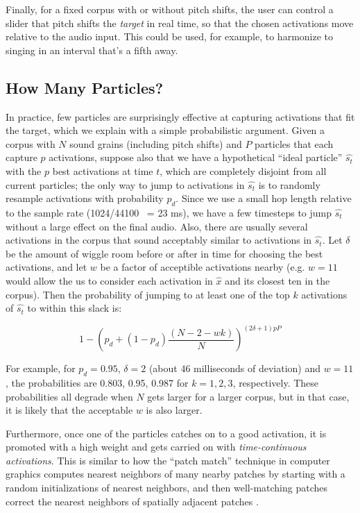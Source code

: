 \documentclass{article}
\begin{document}
Finally, for a fixed corpus with or without pitch shifts, the user can control a slider that pitch shifts the {\em target} in real time, so that the chosen activations move relative to the audio input.  This could be used, for example, to harmonize to singing in an interval that's a fifth away.

\subsection{How Many Particles?}
\label{sec:howmanyparticles}
In practice, few particles are surprisingly effective at capturing activations that fit the target, which we explain with a simple probabilistic argument.  Given a corpus with $N$ sound grains (including pitch shifts) and $P$ particles that each capture $p$ activations, suppose also that we have a hypothetical ``ideal particle'' $\hat{s_t}$ with the $p$ best activations at time $t$, which are completely disjoint from all current particles; the only way to jump to activations in $\hat{s_t}$ is to randomly resample activations with probability $p_d$.  Since we use a small hop length relative to the sample rate (1024/44100 ~= 23 ms), we have a few timesteps to jump $\hat{s_t}$ without a large effect on the final audio.  Also, there are usually several activations in the corpus that sound acceptably similar to activations in $\hat{s_t}$.  Let $\delta$ be the amount of wiggle room before or after in time for choosing the best activations, and let $w$ be a factor of acceptible activations nearby (e.g. $w=11$ would allow the us to consider each activation in $\hat{x}$ and its closest ten in the corpus).  Then the probability of jumping to at least one of the top $k$ activations of $\hat{s_t}$ to within this slack is:

\begin{equation}
    \label{eq:timeadjacentprobmodified}
    1 - \left( p_d + (1-p_d) \frac{(N-2-wk)}{N} \right)^{(2 \delta +1)pP}
\end{equation}

For example, for $p_d = 0.95$, $\delta=2$ (about 46 milliseconds of deviation) and $w = 11$, the probabilities are 0.803, 0.95, 0.987 for $k=1, 2, 3$, respectively.  These probabilities all degrade when $N$ gets larger for a larger corpus, but in that case, it is likely that the acceptable $w$ is also larger.

Furthermore, once one of the particles catches on to a good activation, it is promoted with a high weight and gets carried on with {\em time-continuous activations}.  This is similar to how the ``patch match'' technique in computer graphics \cite{Barnes:2009:PAR, Barnes:2010:TGP} computes nearest neighbors of many nearby patches by starting with a random initializations of nearest neighbors, and then well-matching patches correct the nearest neighbors of  spatially adjacent patches \cite{Barnes:2009:PAR}.
\end{document}
